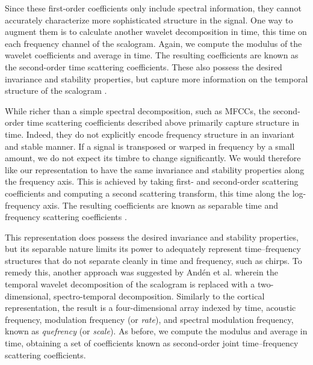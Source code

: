 \documentclass{bmcart}
\begin{document}
Since these first-order coefficients only include spectral information, they cannot accurately characterize more sophisticated structure in the signal.
One way to augment them is to calculate another wavelet decomposition in time, this time on each frequency channel of the scalogram.
Again, we compute the modulus of the wavelet coefficients and average in time.
The resulting coefficients are known as the second-order time scattering coefficients.
These also possess the desired invariance and stability properties, but capture more information on the temporal structure of the scalogram \cite{anden2014deep}.

While richer than a simple spectral decomposition, such as MFCCs, the second-order time scattering coefficients described above primarily capture structure in time.
Indeed, they do not explicitly encode frequency structure in an invariant and stable manner.
If a signal is transposed or warped in frequency by a small amount, we do not expect its timbre to change significantly.
We would therefore like our representation to have the same invariance and stability properties along the frequency axis.
This is achieved by taking first- and second-order scattering coefficients and computing a second scattering transform, this time along the log-frequency axis.
The resulting coefficients are known as separable time and frequency scattering coefficients \cite{anden2014deep}.

This representation does possess the desired invariance and stability properties, but its separable nature limits its power to adequately represent time--frequency structures that do not separate cleanly in time and frequency, such as chirps.
To remedy this, another approach was suggested by And\'{e}n et al. \cite{anden2015joint,anden2019joint} wherein the temporal wavelet decomposition of the scalogram is replaced with a two-dimensional, spectro-temporal decomposition.
Similarly to the cortical representation, the result is a four-dimensional array indexed by time, acoustic frequency, modulation frequency (or \emph{rate}), and spectral modulation frequency, known as \emph{quefrency} (or \emph{scale}).
As before, we compute the modulus and average in time, obtaining a set of coefficients known as second-order joint time--frequency scattering coefficients.
\end{document}
